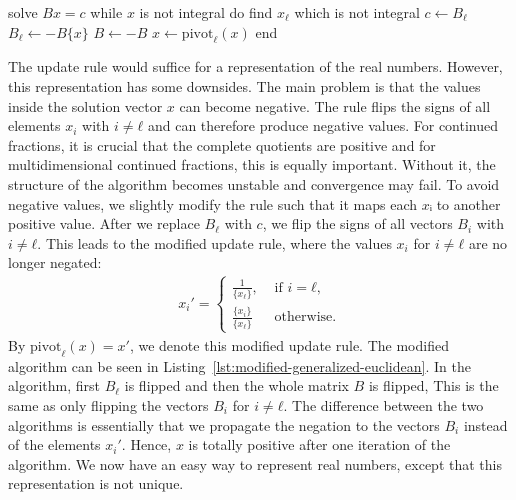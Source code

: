 \begin{Pseudocode}[
    float=tbp,
    label={lst:modified-generalized-euclidean},
    caption={
      The modified algorithm, where the solution $x$ remains entirely positive in each iterations.
      The linear system from the original algorithm is replaced by the update rule.
      The two negations ensure that the vectors represent the correct solution,
      when the modified update rule from Equation~\ref{eq:modified-update-rule} is used.
    }]
solve $Bx = c$
while $x$ is not integral do
  find $x_ℓ$ which is not integral
  $c ← B_ℓ$
  $B_ℓ ← -B\{x\}$
  $B ← -B$
  $x ← \mathrm{pivot}_ℓ(x)$
end
\end{Pseudocode}

The update rule would suffice for a representation of the real numbers.
However, this representation has some downsides.
The main problem is that the values inside the solution vector $x$ can become negative.
The rule flips the signs of all elements $x_i$ with $i ≠ ℓ$
and can therefore produce negative values.
For continued fractions, it is crucial that the complete quotients are positive \cite{Northshield11}
and for multidimensional continued fractions, this is equally important.
Without it, the structure of the algorithm becomes unstable and convergence may fail.
To avoid negative values, we slightly modify the rule such that it maps each $xᵢ$ to another positive value.
After we replace $B_ℓ$ with $c$, we flip the signs of all vectors $B_i$ with $i ≠ ℓ$.
This leads to the modified update rule, where the values $x_i$ for $i ≠ ℓ$ are
no longer negated:
\begin{align}
  \label{eq:modified-update-rule}
  x_i' =
  \begin{cases}
    \frac{1}{\{x_ℓ\}},  & \text{ if } i = ℓ, \\
    \frac{\{x_i\}}{\{x_ℓ\}} & \text{ otherwise.}
  \end{cases}
\end{align}
By $\mathrm{pivot}_ℓ(x) = x'$, we denote this modified update rule.
The modified algorithm can be seen in Listing~\ref{lst:modified-generalized-euclidean}.
In the algorithm, first $B_ℓ$ is flipped and then the whole matrix $B$ is flipped,
This is the same as only flipping the vectors $B_i$ for $i ≠ ℓ$.
The difference between the two algorithms is essentially that we propagate the
negation to the vectors $B_i$ instead of the elements $x_i'$.
Hence, $x$ is totally positive after one iteration of the algorithm.
We now have an easy way to represent real numbers,
except that this representation is not unique.

